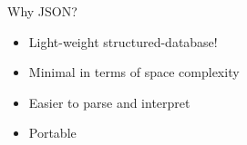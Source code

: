 \begin{frame}{Why JSON?}
	\begin{itemize}
		\item Light-weight structured-database!
		\item Minimal in terms of space complexity
		\item Easier to parse and interpret
		\item Portable
	\end{itemize}
\end{frame}
